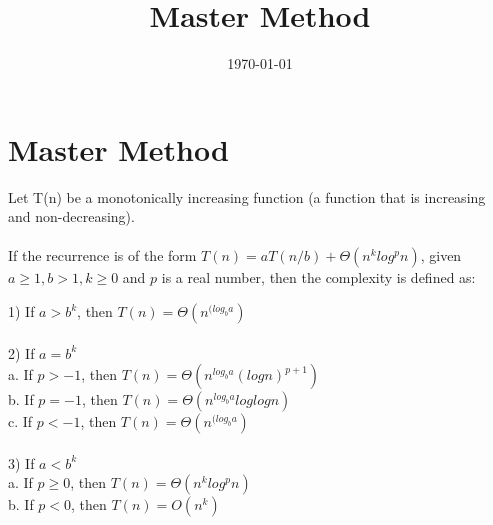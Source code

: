 \documentclass[a4paper, 12pt]{article}
\begin{document}
\title{Master Method}
\date{\today}
\pagestyle{empty} 
\section*{Master Method}
Let T(n) be a monotonically increasing function (a function that is increasing and non-decreasing).\\
	\\
	If the recurrence is of the form $T(n) = aT(n/b) + \Theta(n^k log^p n)$, given $a \geq 1, b > 1, k \geq 0$ and $p$ is a real number, then the complexity is defined as:\\
	
\begin{tabbing}
1) If $a > b^k$, then $T(n) = \Theta(n^{(log_b a})$ \\
\\
2) If $a = b^k$ \=\\
\> a. If $p > -1$, then $T(n) = \Theta(n^{log_b a} (log n)^{p+1})$	\\
\> b. If $p = -1$, then $T(n) = \Theta(n^{log_b a} log log n)$ \\
\> c. If $p < -1$, then $T(n) = \Theta(n^{(log_b a})$\\
\\
3) If $a < b^k$ \\
\> a. If $p \geq 0$, then $T(n) = \Theta(n^k log^p n)$\\
\> b. If $p < 0$, then $T(n) = O(n^k)$ \\
\end{tabbing}
\end{document}
